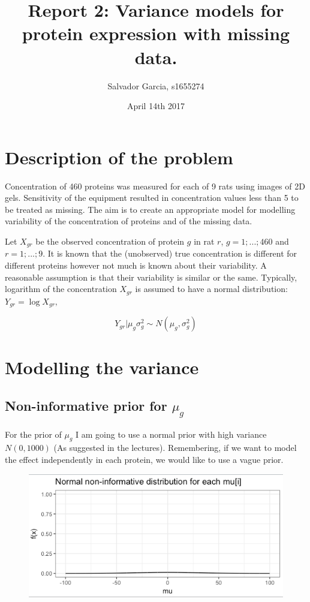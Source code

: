 \documentclass{article}
\author{Salvador Garcia, s1655274}
\date{April 14th 2017}
\title{Report 2: Variance models for protein expression with missing data.}
\begin{document}
\maketitle

\section{Description of the problem} 

Concentration of 460 proteins was measured for each of 9 rats using images of 2D gels. Sensitivity of the equipment resulted in concentration values less than 5 to be treated as missing. The aim is to create an appropriate model for modelling variability of the concentration of proteins and of the missing data.

Let $X_{gr}$ be the observed concentration of protein $g$ in rat $r$, $g = 1; ... ; 460$ and $r = 1; ... ; 9$. It is known that the (unobserved) true concentration is different for different proteins however not much is known about their variability. A reasonable assumption is that their variability is similar or the same. Typically, logarithm of the concentration $X_{gr}$ is assumed to have a normal distribution:
 $Y_{gr} = \log{X_{gr}},$

 $$Y_{gr} | \mu_g \sigma_g^2 \sim N(\mu_g, \sigma_g^2)$$


\section{Modelling the variance}
\subsection*{Non-informative prior for $\mu_g$}
For the prior of $\mu_g$ I am going to use a normal prior with high variance $N(0, 1000)$ (As suggested in the lectures). Remembering, if we want to model the effect independently in each protein, we would like to use a vague prior.

\begin{figure}[ht!]
\centering
\includegraphics[width=12cm]{figures/00_prior1.png}
\end{figure}
\end{document}

